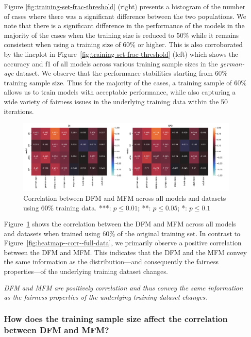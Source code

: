 \documentclass{article}
\newcommand{\highlight}[1]{\begin{framed}%
  \noindent\emph{#1}
\end{framed}}
\begin{document}
Figure \ref{fig:training-set-frac-threshold} (right) presents
a histogram of the number of cases where there was a significant
difference between the two populations. We note that there is
a significant difference in the performance of the models in the
majority of the cases when the training size is reduced to 50\% while
it remains consistent when using a training size of 60\% or
higher. This is also corroborated by the lineplot in
Figure \ref{fig:training-set-frac-threshold} (left) which shows the
accuracy and f1 of all models across various training sample sizes in
the \emph{german-age} dataset. We observe that the performance
stabilities starting from 60\% training sample size. Thus for the
majority of the cases, a training sample of 60\% allows us to train
models with acceptable performance, while also capturing a wide
variety of fairness issues in the underlying training data within the
50 iterations.

\begin{figure}
  \centering
  \includegraphics[width=0.95\linewidth]{heatmap--corr--training-sets-frac.pdf}
  \caption{Correlation between DFM and MFM across all models and
  datasets using 60\% training data. ***: $p\le0.01$; **: $p\le0.05$;
  *: $p\le0.1$}
  \label{fig:heatmap--corr--training-sets-frac}
\end{figure}

Figure \ref{fig:heatmap--corr--training-sets-frac} shows the
correlation between the DFM and MFM across all models and datasets
when trained using 60\% of the original training set. In contrast to
Figure \ref{fig:heatmap--corr--full-data}, we primarily observe
a positive correlation between the DFM and MFM. This indicates that
the DFM and the MFM convey the same information as the
distribution---and consequently the fairness properties---of the
underlying training dataset changes.

\highlight{DFM and MFM are positively correlation and thus convey the
same information as the fairness properties of the underlying training
dataset changes.}

\subsubsection{How does the training sample size affect the correlation between DFM and MFM?}\label{sec:results-corr-frac}
\end{document}
